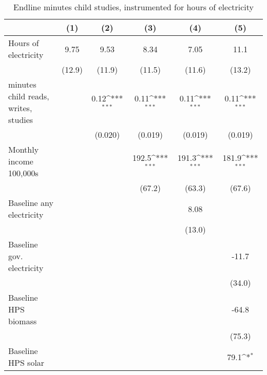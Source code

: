 \begin{table}[htbp]\centering
\def\sym#1{\ifmmode^{#1}\else\(^{#1}\)\fi}
\caption{Endline minutes child studies, instrumented for hours of electricity}
\begin{tabular*}{1\hsize}{@{\hskip\tabcolsep\extracolsep\fill}l*{5}{c}}
\toprule
                &\multicolumn{1}{c}{(1)}         &\multicolumn{1}{c}{(2)}         &\multicolumn{1}{c}{(3)}         &\multicolumn{1}{c}{(4)}         &\multicolumn{1}{c}{(5)}         \\
\midrule
Hours of electricity&     9.75         &     9.53         &     8.34         &     7.05         &     11.1         \\
                &   (12.9)         &   (11.9)         &   (11.5)         &   (11.6)         &   (13.2)         \\
minutes child reads, writes, studies&                  &     0.12\sym{***}&     0.11\sym{***}&     0.11\sym{***}&     0.11\sym{***}\\
                &                  &  (0.020)         &  (0.019)         &  (0.019)         &  (0.019)         \\
Monthly income 100,000s&                  &                  &    192.5\sym{***}&    191.3\sym{***}&    181.9\sym{***}\\
                &                  &                  &   (67.2)         &   (63.3)         &   (67.6)         \\
Baseline any electricity&                  &                  &                  &     8.08         &                  \\
                &                  &                  &                  &   (13.0)         &                  \\
Baseline gov. electricity&                  &                  &                  &                  &    -11.7         \\
                &                  &                  &                  &                  &   (34.0)         \\
Baseline HPS biomass&                  &                  &                  &                  &    -64.8         \\
                &                  &                  &                  &                  &   (75.3)         \\
Baseline HPS solar&                  &                  &                  &                  &     79.1\sym{*}  \\

\end{tabular*}
\end{table}
